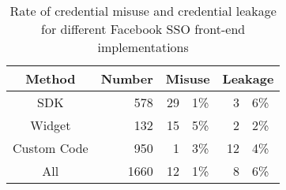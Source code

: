 \begin{table}[b]\centering
\begin{threeparttable}
\begin{tabular}{|c|r|r@{.}l|r@{.}l|}
\multicolumn{1}{c}{Method} & \multicolumn{1}{c}{Number} & \multicolumn{2}{c}{Misuse} & \multicolumn{2}{c}{Leakage} \\
\hline
SDK & 578 & 29 & 1\% & 3 & 6\%\\
\hline
Widget & 132 & 15 & 5\% & 2 & 2\%\\
\hline
Custom Code & 950 & 1 & 3\% & 12 & 4\%\\
\hline\hline
All & 1660  & 12 & 1\% & 8 & 6\%\\
\hline
\end{tabular}
\end{threeparttable}
\caption{Rate of credential misuse and credential leakage for different Facebook SSO front-end implementations}
\label{tab:ssoscanStudyFront-end}
\end{table}